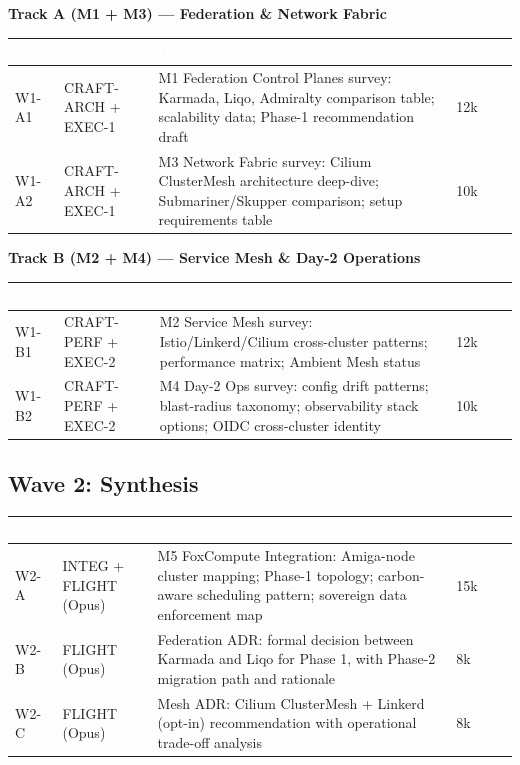 \documentclass[11pt,letterpaper]{article}
\newcommand{\tableheader}[1]{\textbf{\sffamily\textcolor{white}{#1}}}
\begin{document}
\textbf{Track A (M1 + M3) --- Federation \& Network Fabric}

\begin{center}
\begin{tabularx}{\textwidth}{L{2cm}L{3.5cm}XC{2cm}}
\toprule
{}
\tableheader{Task} & \tableheader{Agent} & \tableheader{Output} & \tableheader{Tokens} \\
\midrule
W1-A1 & CRAFT-ARCH + EXEC-1 & M1 Federation Control Planes survey: Karmada, Liqo, Admiralty comparison table; scalability data; Phase-1 recommendation draft & 12k \\
W1-A2 & CRAFT-ARCH + EXEC-1 & M3 Network Fabric survey: Cilium ClusterMesh architecture deep-dive; Submariner/Skupper comparison; setup requirements table & 10k \\
\bottomrule
\end{tabularx}
\end{center}

\textbf{Track B (M2 + M4) --- Service Mesh \& Day-2 Operations}

\begin{center}
\begin{tabularx}{\textwidth}{L{2cm}L{3.5cm}XC{2cm}}
\toprule
{}
\tableheader{Task} & \tableheader{Agent} & \tableheader{Output} & \tableheader{Tokens} \\
\midrule
W1-B1 & CRAFT-PERF + EXEC-2 & M2 Service Mesh survey: Istio/Linkerd/Cilium cross-cluster patterns; performance matrix; Ambient Mesh status & 12k \\
W1-B2 & CRAFT-PERF + EXEC-2 & M4 Day-2 Ops survey: config drift patterns; blast-radius taxonomy; observability stack options; OIDC cross-cluster identity & 10k \\
\bottomrule
\end{tabularx}
\end{center}

\subsection{Wave 2: Synthesis}

\begin{center}
\begin{tabularx}{\textwidth}{L{2cm}L{3.5cm}XC{2cm}}
\toprule
{}
\tableheader{Task} & \tableheader{Agent} & \tableheader{Output} & \tableheader{Tokens} \\
\midrule
W2-A & INTEG + FLIGHT (Opus) & M5 FoxCompute Integration: Amiga-node cluster mapping; Phase-1 topology; carbon-aware scheduling pattern; sovereign data enforcement map & 15k \\
W2-B & FLIGHT (Opus) & Federation ADR: formal decision between Karmada and Liqo for Phase 1, with Phase-2 migration path and rationale & 8k \\
W2-C & FLIGHT (Opus) & Mesh ADR: Cilium ClusterMesh + Linkerd (opt-in) recommendation with operational trade-off analysis & 8k \\
\bottomrule
\end{tabularx}
\end{center}
\end{document}
